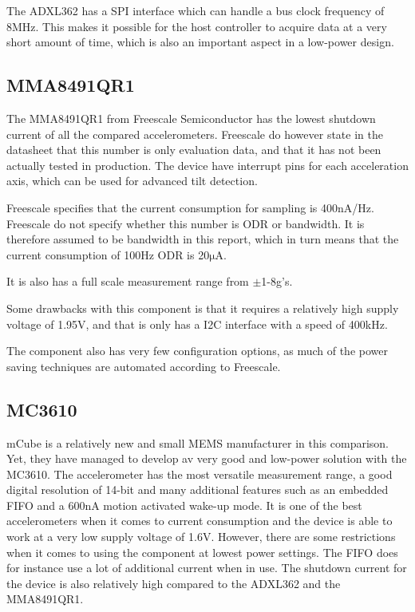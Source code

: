 The ADXL362 has a SPI interface which can handle a bus clock frequency of 8MHz. This makes it possible for the host controller to acquire data at a very short amount of time, which is also an important aspect in a low-power design.

\subsection{MMA8491QR1}

The MMA8491QR1 from Freescale Semiconductor has the lowest shutdown current of all the compared accelerometers. Freescale do however state in the datasheet that this number is only evaluation data, and that it has not been actually tested in production. The device have interrupt pins for each acceleration axis, which can be used for advanced tilt detection.

Freescale specifies that the current consumption for sampling is 400nA/Hz. Freescale do not specify whether this number is ODR or bandwidth. It is therefore assumed to be bandwidth in this report, which in turn means that the current consumption of 100Hz ODR is 20$\si{\micro\ampere}$. 

It is also has a full scale measurement range from $\pm$1-8g's.

Some drawbacks with this component is that it requires a relatively high supply voltage of 1.95V, and that is only has a I2C interface with a speed of 400kHz.

The component also has very few configuration options, as much of the power saving techniques are automated according to Freescale.

\subsection{MC3610}
mCube is a relatively new and small MEMS manufacturer in this comparison. Yet, they have managed to develop av very good and low-power solution with the MC3610. The accelerometer has the most versatile measurement range, a good digital resolution of 14-bit and many additional features such as an embedded FIFO and a 600nA motion activated wake-up mode. It is one of the best accelerometers when it comes to current consumption and the device is able to work at a very low supply voltage of 1.6V. However, there are some restrictions when it comes to using the component at lowest power settings. The FIFO does for instance use a lot of additional current when in use. The shutdown current for the device is also relatively high compared to the ADXL362 and the MMA8491QR1.

